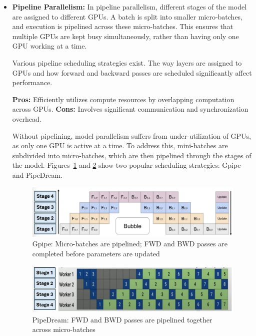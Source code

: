 \documentclass[12pt]{book}
\begin{document}
\begin{itemize}
    \item \textbf{Pipeline Parallelism:}  
    In pipeline parallelism, different stages of the model are assigned to different GPUs. A batch is split into smaller micro-batches, and execution is pipelined across these micro-batches. This ensures that multiple GPUs are kept busy simultaneously, rather than having only one GPU working at a time.  

    Various pipeline scheduling strategies exist. The way layers are assigned to GPUs and how forward and backward passes are scheduled significantly affect performance.  

    \textbf{Pros:} Efficiently utilizes compute resources by overlapping computation across GPUs.  
    \textbf{Cons:} Involves significant communication and synchronization overhead.  

    Without pipelining, model parallelism suffers from under-utilization of GPUs, as only one GPU is active at a time. To address this, mini-batches are subdivided into micro-batches, which are then pipelined through the stages of the model. Figures~\ref{fig:pipestrag1} and \ref{fig:pipestrag2} show two popular scheduling strategies: Gpipe and PipeDream.  

    \begin{figure}[ht]
        \centering
        \includegraphics[width=0.75\linewidth]{images/pipestrag1.png}
        \caption{Gpipe: Micro-batches are pipelined; FWD and BWD passes are completed before parameters are updated}
        \label{fig:pipestrag1}
    \end{figure}

    \begin{figure}[ht]
        \centering
        \includegraphics[width=0.75\linewidth]{images/pipstrag2.png}
        \caption{PipeDream: FWD and BWD passes are pipelined together across micro-batches}
        \label{fig:pipestrag2}
    \end{figure}


\end{itemize}
\end{document}
